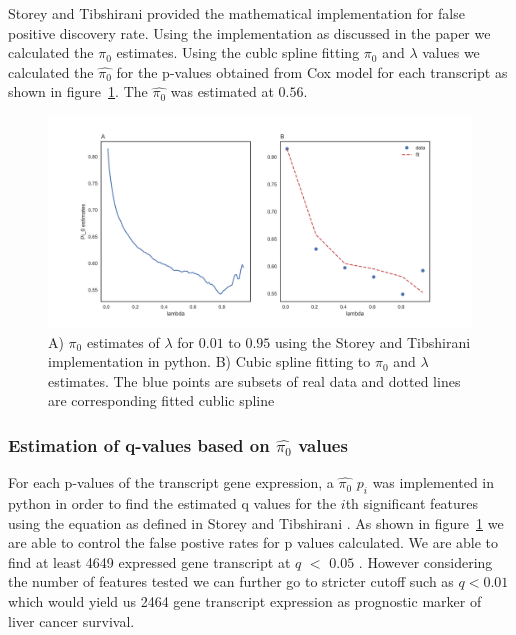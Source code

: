 \documentclass[11pt]{article}
\begin{document}
	Storey and Tibshirani \cite{storey2003statistical} provided the mathematical implementation for false positive discovery rate.  Using the implementation as discussed in the paper we calculated the $\pi_0$ estimates. Using the cublc spline fitting $\pi_0$ and  $\lambda$ values we calculated the  $\hat {\pi_0}$ for the p-values obtained from Cox model for each transcript as shown in figure~\ref{fig:estimate_pi}. The  $\hat {\pi_0}$  was estimated at $0.56$. 
\vspace{50cm} 
\begin{figure}
    \centering
     \includegraphics[width=\textwidth]{lambdaestimatescurvefitting.png}
    \caption{ A) $\pi_0$ estimates of $\lambda$  for $0.01$ to $0.95$ using the Storey and Tibshirani \cite{storey2003statistical} implementation in python. B) Cubic spline fitting to $\pi_0$  and $\lambda$ estimates. The blue points are subsets of real data and dotted lines are corresponding  fitted cublic spline   \tiny}
    \label{fig:estimate_pi}
\end{figure}

	\subsubsection {Estimation of q-values based on $\hat {\pi_0}$  values }
	 For each p-values of the transcript gene expression, a $\hat {\pi_0}$ $p_i$  was implemented in python in order to find the estimated q values for the  $i$th significant features using the equation as defined in Storey and Tibshirani \cite{storey2003statistical}. As shown in figure~\ref{fig:estimate_pi} we are able to control the false postive rates for p values calculated. We are able to find at least 4649 expressed gene transcript at $q$ $<$ $0.05$ . However considering the number of features tested we can further go to stricter cutoff such as $q < 0.01$ which would yield us 2464 gene transcript expression  as prognostic marker of liver cancer survival. 
\end{document}
